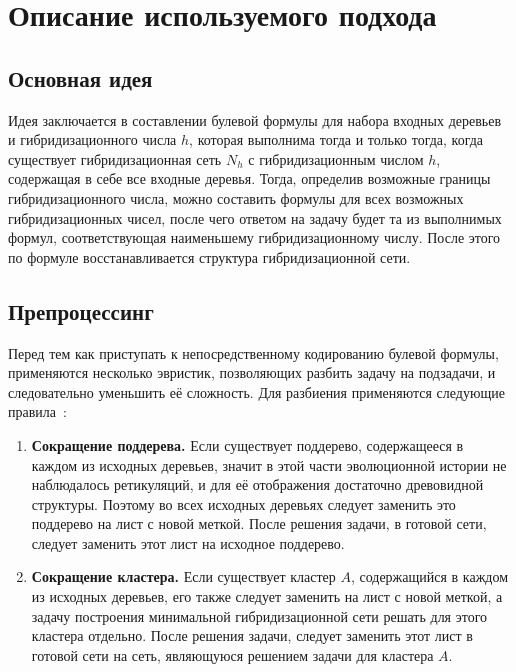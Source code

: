 \FloatBarrier
\chapter{Описание используемого подхода}

\FloatBarrier
\section{Основная идея}

Идея заключается в составлении булевой формулы для набора входных деревьев и гибридизационного числа $h$, которая выполнима тогда и только тогда, когда существует гибридизационная сеть $N_h$ с гибридизационным числом $h$, содержащая в себе все входные деревья.
Тогда, определив возможные границы гибридизационного числа, можно составить формулы для всех возможных гибридизационных чисел, после чего ответом на задачу будет та из выполнимых формул, соответствующая наименьшему гибридизационному числу.
После этого по формуле восстанавливается структура гибридизационной сети.

\FloatBarrier
\section{Препроцессинг}

Перед тем как приступать к непосредственному кодированию булевой формулы, применяются несколько эвристик, позволяющих разбить задачу на подзадачи, и следовательно уменьшить её сложность.
Для разбиения применяются следующие правила~\cite{bonet2009efficiently}:

\begin{enumerate}
	\item \textbf{Сокращение поддерева.} Если существует поддерево, содержащееся в каждом из исходных деревьев, значит в этой части эволюционной истории не наблюдалось ретикуляций, и для её отображения достаточно древовидной структуры.
	Поэтому во всех исходных деревьях следует заменить это поддерево на лист с новой меткой.
	После решения задачи, в готовой сети, следует заменить этот лист на исходное поддерево.
	\item \textbf{Сокращение кластера.} Если существует кластер $A$, содержащийся в каждом из исходных деревьев, его также следует заменить на лист с новой меткой, а задачу построения минимальной гибридизационной сети решать для этого кластера отдельно.
	После решения задачи, следует заменить этот лист в готовой сети на сеть, являющуюся решением задачи для кластера $A$.
\end{enumerate}

